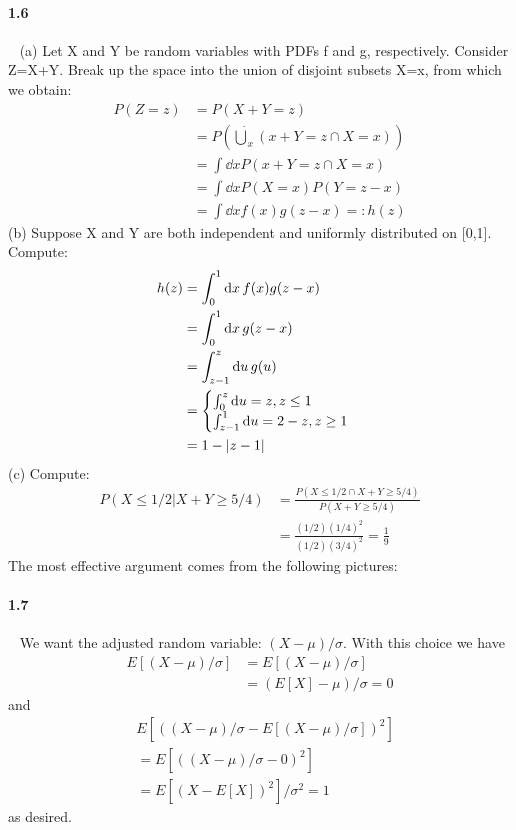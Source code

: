\documentclass{article}
\begin{document}
\paragraph{1.6}\ \newline
(a) Let X and Y be random variables with PDFs f and g, respectively. Consider Z=X+Y. Break up the space into the union of disjoint subsets X=x, from which we obtain:
\begin{align}
    P(Z=z)
    &=P(X+Y=z) \\
    &=P(\underset{x}{\dot{\bigcup}} (x+Y=z \cap X=x)) \\
    &=\int \dd{x} P(x+Y=z \cap X=x) \\
    &=\int \dd{x} P(X=x) P(Y=z-x) \\
    &=\int \dd{x} f(x) g(z-x) =: h(z)
\end{align}
\newline
\newline
(b) Suppose X and Y are both independent and uniformly distributed on [0,1]. Compute:
\begin{align}
    h(z)
    &=\int_0^1 \dd{x} f(x) g(z-x) \\
    &=\int_0^1 \dd{x} g(z-x) \\
    &=\int_{z-1}^{z} \dd{u} g(u) \\
    &=
    \begin{cases}
        \int_{0}^{z}\dd{u} = z, z \le 1 \\
        \int_{z-1}^{1}\dd{u} = 2-z, z \ge 1
    \end{cases} \\
    &= 1-\abs{z-1}
\end{align}
\newline
\newline
(c) Compute:
\begin{align}
    P(X \le 1/2 | X+Y \ge 5/4) 
    &= \frac{P(X \le 1/2 \cap X+Y \ge 5/4)}{P(X+Y \ge 5/4)} \\
    &= \frac{(1/2)(1/4)^2}{(1/2)(3/4)^2} = \frac{1}{9}
\end{align}
The most effective argument comes from the following pictures:

\paragraph{1.7}\ \newline
We want the adjusted random variable: $(X-\mu)/\sigma$. With this choice we have
\begin{align}
    E[(X-\mu)/\sigma]
    &=E[(X-\mu)/\sigma] \\
    &=(E[X]-\mu)/\sigma = 0
\end{align}
and
\begin{align}
    &E[((X-\mu)/\sigma-E[(X-\mu)/\sigma])^2] \\
    &=E[((X-\mu)/\sigma - 0)^2]\\
    &=E[(X-E[X])^2]/\sigma^2 = 1
\end{align}
as desired.
\end{document}
